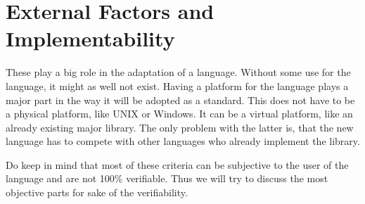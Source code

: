 \section{External Factors and Implementability}
These play a big role in the adaptation of a language.
Without some use for the language, it might as well not exist.
Having a platform for the language plays a major part in the way it will be adopted as a standard.
This does not have to be a physical platform, like UNIX or Windows.
It can be a virtual platform, like an already existing major library.
The only problem with the latter is, that the new language has to compete with other languages who already implement the library.

\bigskip

Do keep in mind that most of these criteria can be subjective to the user of the language and are not 100\% verifiable.
Thus we will try to discuss the most objective parts for sake of the verifiability.
